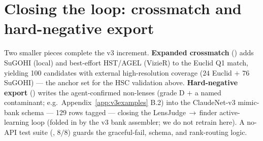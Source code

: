 \documentclass[11pt,letterpaper]{article}
\newcommand{\xmEuclidN}{24}\newcommand{\xmSugohiN}{76}\newcommand{\xmTotalN}{100}
\newcommand{\hardnegN}{129}
\begin{document}
\section{Closing the loop: crossmatch and hard-negative export}
\label{sec:v3loop}
\begin{sloppypar}
Two smaller pieces complete the v3 increment. \textbf{Expanded crossmatch}
() adds SuGOHI (local) and best-effort HST/AGEL (VizieR) to the
Euclid Q1 match, yielding \xmTotalN{} candidates with external high-resolution coverage
($\xmEuclidN$ Euclid $+$ $\xmSugohiN$ SuGOHI) --- the anchor set for the HSC validation above.
\textbf{Hard-negative export} () writes the agent-confirmed
non-lenses (grade D $+$ a named contaminant; e.g.\ Appendix~\ref{app:v3examples} B.2) into the
ClaudeNet-v3 mimic-bank schema --- \hardnegN{} rows tagged  ---
closing the LensJudge\,$\to$\,finder active-learning loop (folded in by the v3 bank assembler; we do not retrain
here). A no-API test suite (, $8/8$) guards the graceful-fail, schema, and
rank-routing logic.
\end{sloppypar}
\end{document}
